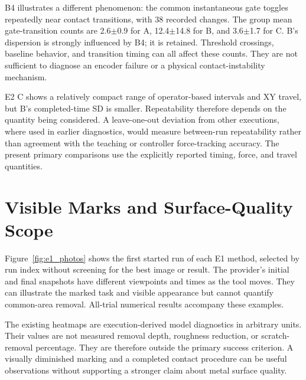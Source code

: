 B4 illustrates a different phenomenon: the common instantaneous gate toggles repeatedly near contact transitions, with 38 recorded changes. The group mean gate-transition counts are 2.6\(\pm\)0.9 for A, 12.4\(\pm\)14.8 for B, and 3.6\(\pm\)1.7 for C. B's dispersion is strongly influenced by B4; it is retained. Threshold crossings, baseline behavior, and transition timing can all affect these counts. They are not sufficient to diagnose an encoder failure or a physical contact-instability mechanism.

E2 C shows a relatively compact range of operator-based intervals and XY travel, but B's completed-time SD is smaller. Repeatability therefore depends on the quantity being considered. A leave-one-out deviation from other executions, where used in earlier diagnostics, would measure between-run repeatability rather than agreement with the teaching or controller force-tracking accuracy. The present primary comparisons use the explicitly reported timing, force, and travel quantities.

\section{Visible Marks and Surface-Quality Scope}
Figure~\ref{fig:e1_photos} shows the first started run of each E1 method, selected by run index without screening for the best image or result. The provider's initial and final snapshots have different viewpoints and times as the tool moves. They can illustrate the marked task and visible appearance but cannot quantify common-area removal. All-trial numerical results accompany these examples.



The existing heatmaps are execution-derived model diagnostics in arbitrary units. Their values are not measured removal depth, roughness reduction, or scratch-removal percentage. They are therefore outside the primary success criterion. A visually diminished marking and a completed contact procedure can be useful observations without supporting a stronger claim about metal surface quality.

